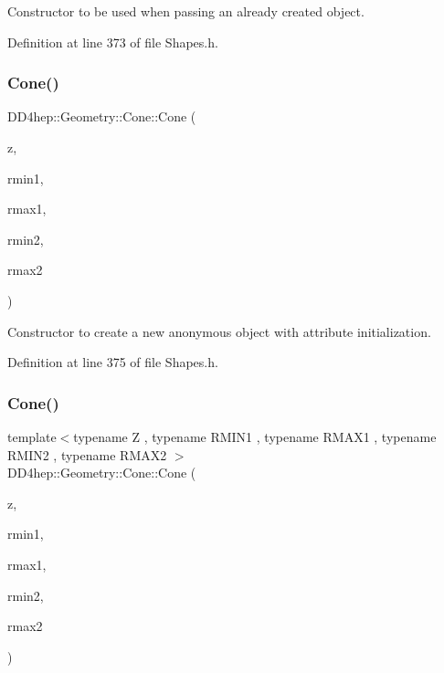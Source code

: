 Constructor to be used when passing an already created object. 



Definition at line 373 of file Shapes.\+h.

\hypertarget{class_d_d4hep_1_1_geometry_1_1_cone_a88d9236d88f467a6a17b1b729cf54afa}{}\label{class_d_d4hep_1_1_geometry_1_1_cone_a88d9236d88f467a6a17b1b729cf54afa} 
\subsubsection{\texorpdfstring{Cone()}{Cone()}\hspace{0.1cm}{\footnotesize\ttfamily [5/6]}}
{\footnotesize\ttfamily D\+D4hep\+::\+Geometry\+::\+Cone\+::\+Cone (\begin{DoxyParamCaption}\item[{double}]{z,  }\item[{double}]{rmin1,  }\item[{double}]{rmax1,  }\item[{double}]{rmin2,  }\item[{double}]{rmax2 }\end{DoxyParamCaption})\hspace{0.3cm}{\ttfamily [inline]}}



Constructor to create a new anonymous object with attribute initialization. 



Definition at line 375 of file Shapes.\+h.

\hypertarget{class_d_d4hep_1_1_geometry_1_1_cone_ac29cc3646d820ac565da27f57385e724}{}\label{class_d_d4hep_1_1_geometry_1_1_cone_ac29cc3646d820ac565da27f57385e724} 
\subsubsection{\texorpdfstring{Cone()}{Cone()}\hspace{0.1cm}{\footnotesize\ttfamily [6/6]}}
{\footnotesize\ttfamily template$<$typename Z , typename R\+M\+I\+N1 , typename R\+M\+A\+X1 , typename R\+M\+I\+N2 , typename R\+M\+A\+X2 $>$ \\
D\+D4hep\+::\+Geometry\+::\+Cone\+::\+Cone (\begin{DoxyParamCaption}\item[{const Z \&}]{z,  }\item[{const R\+M\+I\+N1 \&}]{rmin1,  }\item[{const R\+M\+A\+X1 \&}]{rmax1,  }\item[{const R\+M\+I\+N2 \&}]{rmin2,  }\item[{const R\+M\+A\+X2 \&}]{rmax2 }\end{DoxyParamCaption})\hspace{0.3cm}{\ttfamily [inline]}}



